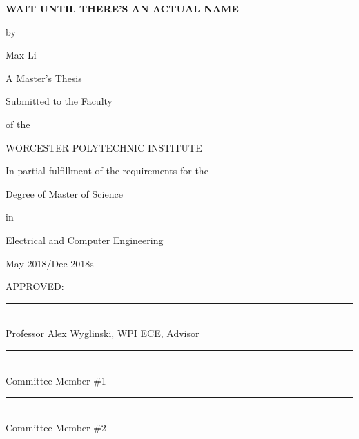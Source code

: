 \documentclass[12pt]{report}
\begin{document}
	\newcommand{\brk}{\vspace*{0.18in}}
	
	\thispagestyle{empty}
	
	\begin{center}
		
		\brk
		
		
		{\large 
			\textbf{
				WAIT UNTIL THERE'S AN ACTUAL NAME
			}
		}		
		
		\brk
		by
		
		\brk
		Max Li
		
		\brk
		\brk
		A Master's Thesis
		
		\brk
		Submitted to the Faculty 
		
		\brk
		of the
		
		\brk
		\brk
		WORCESTER POLYTECHNIC INSTITUTE
		
		\brk
		\brk
		In partial fulfillment of the requirements for the
		
		\brk
		Degree of Master of Science
		
		\brk
		in
		
		\brk
		Electrical and Computer Engineering
		
		\brk
		May 2018/Dec 2018s
	\end{center}
	
	\setlength{\parindent}{0pt}
	\brk
	\brk
	\brk
	APPROVED:\\

	\rule{3in}{0.8pt}\\
	Professor Alex Wyglinski, WPI ECE, Advisor\\

    \rule{3in}{0.8pt}\\
	Committee Member \#1\\

    \rule{3in}{0.8pt}\\
    Committee Member \#2\\
\end{document}
